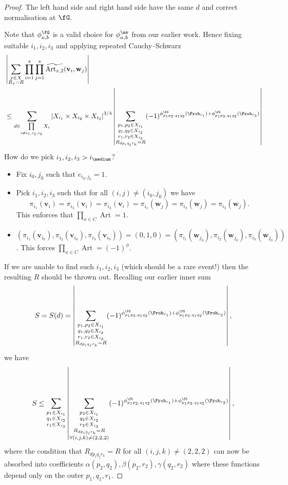 \documentclass{lecturenotes}
\newcommand{\Art}{\operatorname{Art}}
\newcommand{\bv}{\mathbf{v}}
\newcommand{\bw}{\mathbf{w}}
\numberwithin{equation}{section}
\begin{document}
\begin{proof}
    The left hand side and right hand side have the same $d$ and correct normalisation at $\fG$.  


    Note that $\phi_{a,b}^{\fG}$ is a valid choice for $\phi_{a,b}^\nr$ from our earlier work.  Hence fixing suitable $i_1,i_2,i_3$ and applying repeated Cauchy--Schwarz
    \begin{align*}
        &\abs{\sum_{\substack{x\in X\\R_x=R}}\prod_{i=1}^s\prod_{j=1}^s\widetilde{\Art_{x,2}}(\bv_i,\bw_j)}
        \\&\leq \sum_{d\in \prod\limits_{i\neq i_1,i_2,i_3}X_i}\abs{X_{i_1}\times X_{i_2}\times X_{i_3}}^{3/4}\abs{
            \sum_{\substack{p_1,p_2\in X_{i_1}\\q_1,q_2\in X_{i_2}\\r_1,r_2\in X_{i_3}\\R_{dp_iq_jr_k}=R}}(-1)^{\phi_{p_1p_2,q_1q_2}^{\fG}(\Frob_{r_1})+\phi_{p_1p_2,q_1q_2}^{\fG}(\Frob_{r_2})}
        }
    \end{align*}
    How do we pick $i_1,i_2,i_3>i_{\medium}$?
    \begin{itemize}
        \item  Fix $i_0,j_0$ such that $e_{i_0,j_0}=1$.
        \item Pick $i_1,i_2,i_3$ such that for all $(i,j)\neq (i_0,j_0)$ we have 
        \[\pi_{i_1}(\bv_i)=\pi_{i_2}(\bv_i)=\pi_{i_3}(\bv_i)=\pi_{i_1}(\bw_j)=\pi_{i_2}(\bw_j)=\pi_{i_3}(\bw_j).\]
        This enforces that $\prod_{x\in C}\Art=1$.
        \item $(\pi_{i_1}(\bv_{i_0}), \pi_{i_2}(\bv_{i_0}), \pi_{i_3}(\bv_{i_0}))=(0,1,0)=(\pi_{i_1}(\bw_{j_0}), \pi_{i_2}(\bw_{j_0}), \pi_{i_3}(\bw_{j_0}))$.  This forces $\prod_{x\in C}\Art=(-1)^{\phi}$.
    \end{itemize}
    If we are unable to find such $i_1,i_2,i_3$ (which should be a rare event!) then the resulting $R$ should be thrown out.  Recalling our earlier inner sum
    \[S=S(d)=\abs{\sum_{\substack{p_1,p_2\in X_{i_1}\\q_1,q_2\in X_{i_2}\\r_1,r_2\in X_{i_3}\\R_{dp_iq_jr_k}=R}}(-1)^{\phi_{p_1p_2,q_1q_2}^{\fG}(\Frob_{r_1})+\phi_{p_1p_2,q_1q_2}^{\fG}(\Frob_{r_2})}},\]
    we have 
    \[S\leq \sum_{\substack{p_1\in X_{i_1}\\q_1\in X_{i_2}\\r_1\in X_{i_3}}}\abs{\sum_{\substack{p_2\in X_{i_1}\\q_2\in X_{i_2}\\r_2\in X_{i_3}\\R_{dp_iq_jr_k}=R\\\forall(i,j,k)\neq (2,2,2)}}(-1)^{\phi_{p_1p_2,q_1q_2}^{\fG}(\Frob_{r_1})+\phi_{p_1p_2,q_1q_2}^{\fG}(\Frob_{r_2})}},\]
    where the condition that $R_{dp_iq_jr_k}=R$ for all $(i,j,k)\neq (2,2,2)$ can now be absorbed into coefficients $\alpha(p_2,q_2),\beta(p_2,r_2),\gamma(q_2,r_2)$ where these functions depend only on the outer $p_1,q_1,r_1$.


\end{proof}
\end{document}
